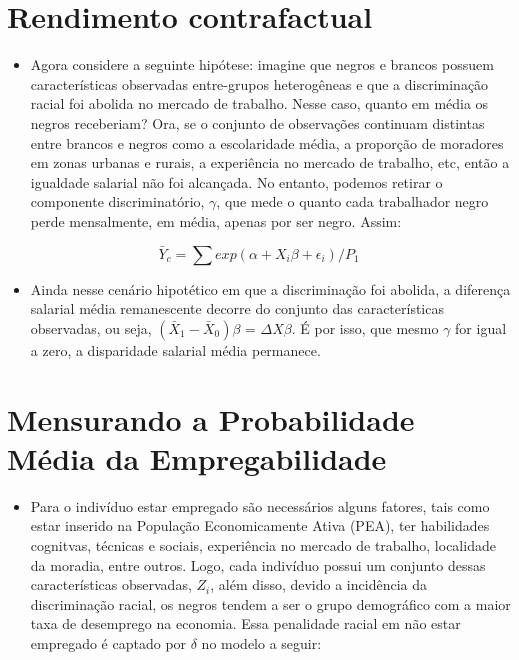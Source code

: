 \documentclass{article}
\begin{document}
	\section{Rendimento contrafactual}
\begin{itemize}
	\item Agora considere a seguinte hipótese: imagine que negros e brancos possuem características observadas entre-grupos heterogêneas e que a discriminação racial foi abolida no mercado de trabalho. Nesse caso, quanto em média os negros receberiam? Ora, se o conjunto de observações continuam distintas entre brancos e negros como a escolaridade média, a proporção de moradores em zonas urbanas e rurais, a experiência no mercado de trabalho, etc, então a igualdade salarial não foi alcançada. No entanto, podemos retirar o componente discriminatório, $\gamma$, que mede o quanto cada trabalhador negro perde mensalmente, em média, apenas por ser negro. Assim:
\end{itemize}	

\begin{equation}
	\bar{Y}_{c} = \sum exp(\alpha + X_{i}\beta +  \epsilon_{i})/P_{1} 
\end{equation}

\begin{itemize}
	\item Ainda nesse cenário hipotético em que a discriminação foi abolida, a diferença salarial média remanescente decorre do conjunto das características observadas, ou seja, $(\bar{X}_{1} - \bar{X}_{0})\beta$ = $\Delta X\beta$. É por isso, que mesmo $\gamma$ for igual a zero, a disparidade salarial média permanece.
\end{itemize}


\section{Mensurando a Probabilidade Média da Empregabilidade}
\begin{itemize}
	\item Para o indivíduo estar empregado são necessários alguns fatores, tais como estar inserido na População Economicamente Ativa (PEA), ter habilidades cognitvas, técnicas e sociais, experiência no mercado de trabalho, localidade da moradia, entre outros. Logo, cada indivíduo possui um conjunto dessas características observadas, $Z_{i}$, além disso, devido a incidência da discriminação racial, os negros tendem a ser o grupo demográfico com a maior taxa de desemprego na economia. Essa penalidade racial em não estar empregado é captado por $\delta$ no modelo a seguir:
\end{itemize}
\end{document}
